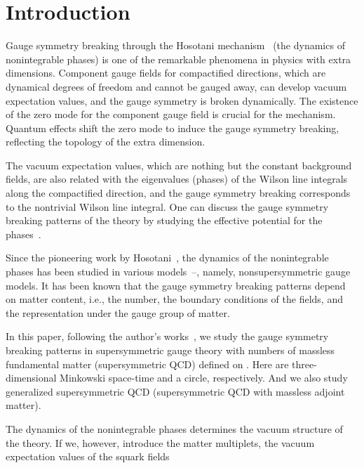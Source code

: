 \documentclass[a4paper,12pt]{article}
\begin{document}
\section{Introduction}
Gauge symmetry breaking through the Hosotani 
mechanism~\cite{hosotani, hosotanib} (the dynamics of nonintegrable 
phases) is one of the 
remarkable phenomena in physics with extra 
dimensions. 
Component gauge fields for compactified 
directions, which are dynamical degrees of freedom and cannot be gauged 
away, can develop vacuum expectation values, and the gauge symmetry
is broken dynamically.
The existence of the zero mode for the component gauge
field is crucial for the mechanism. Quantum effects shift the zero mode
to induce the gauge symmetry breaking, reflecting the topology of the
extra dimension. 
\par
The vacuum expectation values, which are 
nothing but the constant background fields, are also related with the 
eigenvalues (phases) of the Wilson line 
integrals along the compactified direction, and 
the gauge symmetry breaking corresponds to 
the nontrivial Wilson line integral.
One can discuss the gauge symmetry breaking patterns of the theory
by studying the effective potential for the phases~\cite{hosotanib}.
\par
Since the pioneering work by Hosotani~\cite{hosotani}, the 
dynamics of the nonintegrable
phases has been studied in various 
models~\cite{hosotanib}--\cite{inte}, namely, nonsupersymmetric 
gauge models. It has been known that the gauge 
symmetry breaking patterns depend 
on matter content, i.e., the number, the boundary conditions of the 
fields, and the representation under the gauge group of matter. 
\par
In this paper, following the author's works~\cite{takenaga, takenagab}, we 
study the gauge symmetry breaking patterns in  
supersymmetric \coordHE{} gauge theory with \coordHE{} numbers of massless
fundamental matter (supersymmetric QCD) defined on \coordHE{}.
Here \coordHE{} are three-dimensional Minkowski space-time and a 
circle, respectively. And we also study  
generalized supersymmetric QCD
(supersymmetric QCD with massless adjoint matter). 
\par
The dynamics of the nonintegrable phases determines the vacuum structure 
of the theory. If we, however, introduce the matter multiplets, the 
vacuum expectation values of the squark fields
\end{document}

